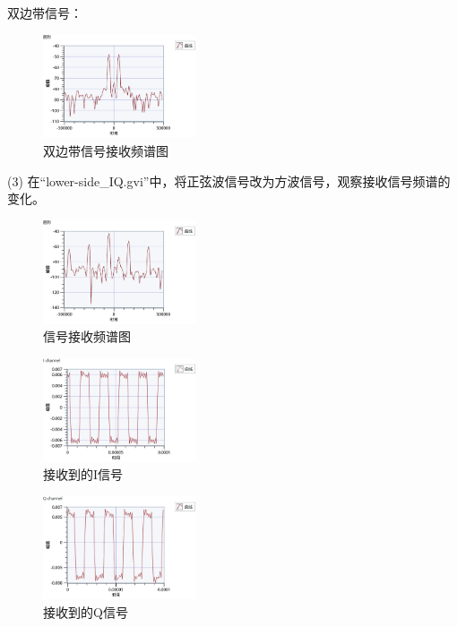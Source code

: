 \documentclass{../source/Experiment}
\begin{document}
        双边带信号：

        \begin{figure}[H]
            \centering
            \includegraphics[width = 0.4\textwidth]{lab9/DOUBLE.png}
            \caption{双边带信号接收频谱图}
        \end{figure}

        (3) 在“lower-side\_IQ.gvi”中，将正弦波信号改为方波信号，观察接收信号频谱的 变化。
        \begin{figure}[H]
            \centering
            \includegraphics[width = 0.4\textwidth]{lab9/LOWER_SQUARE.png}
            \caption{信号接收频谱图}
        \end{figure}
        \begin{figure}[H]
            \centering
            \includegraphics[width = 0.4\textwidth]{lab9/LOWER_SQUARE_I.png}
            \caption{接收到的I信号}
        \end{figure}
        \begin{figure}[H]
            \centering
            \includegraphics[width = 0.4\textwidth]{lab9/LOWER_SQUARE_Q.png}
            \caption{接收到的Q信号}
        \end{figure}
\end{document}
